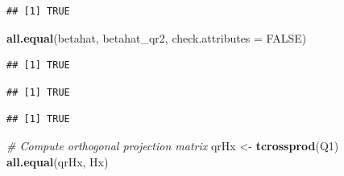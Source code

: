 \documentclass[]{book}
\newenvironment{Shaded}{\begin{snugshade}}{\end{snugshade}}
\newcommand{\KeywordTok}[1]{\textcolor[rgb]{0.13,0.29,0.53}{\textbf{#1}}}
\newcommand{\DataTypeTok}[1]{\textcolor[rgb]{0.13,0.29,0.53}{#1}}
\newcommand{\StringTok}[1]{\textcolor[rgb]{0.31,0.60,0.02}{#1}}
\newcommand{\CommentTok}[1]{\textcolor[rgb]{0.56,0.35,0.01}{\textit{#1}}}
\newcommand{\OtherTok}[1]{\textcolor[rgb]{0.56,0.35,0.01}{#1}}
\newcommand{\OperatorTok}[1]{\textcolor[rgb]{0.81,0.36,0.00}{\textbf{#1}}}
\newcommand{\NormalTok}[1]{#1}
\theoremstyle{definition}
\theoremstyle{definition}
\theoremstyle{definition}
\theoremstyle{remark}
\begin{document}
\begin{verbatim}
## [1] TRUE
\end{verbatim}

\begin{Shaded}
\begin{Highlighting}[]
\KeywordTok{all.equal}\NormalTok{(betahat, betahat_qr2, }\DataTypeTok{check.attributes =} \OtherTok{FALSE}\NormalTok{)}
\end{Highlighting}
\end{Shaded}

\begin{verbatim}
## [1] TRUE
\end{verbatim}

\begin{Shaded}
\end{Shaded}

\begin{verbatim}
## [1] TRUE
\end{verbatim}

\begin{Shaded}
\end{Shaded}

\begin{verbatim}
## [1] TRUE
\end{verbatim}

\begin{Shaded}
\begin{Highlighting}[]
\CommentTok{# Compute orthogonal projection matrix}
\NormalTok{qrHx <-}\StringTok{ }\KeywordTok{tcrossprod}\NormalTok{(Q1)}
\KeywordTok{all.equal}\NormalTok{(qrHx, Hx)}
\end{Highlighting}
\end{Shaded}
\end{document}
